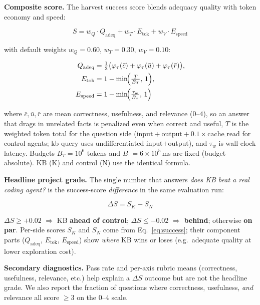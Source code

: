 \medskip
\noindent\textbf{Composite score.}  The harvest success score blends adequacy
quality with token economy and speed:

\begin{equation}
S = w_Q \cdot Q_{\text{adeq}} + w_T \cdot E_{\text{tok}} + w_V \cdot E_{\text{speed}}
\label{eq:success}
\end{equation}

\noindent with default weights $w_Q = 0.60$, $w_T = 0.30$, $w_V = 0.10$:

\begin{align}
Q_{\text{adeq}} &= \tfrac{1}{3}\bigl(\varphi_\tau(\bar{c}) + \varphi_\tau(\bar{u}) + \varphi_\tau(\bar{r})\bigr), \notag \\
E_{\text{tok}} &= 1 - \min\!\Bigl(\tfrac{T}{B_T},\,1\Bigr), \notag \\
E_{\text{speed}} &= 1 - \min\!\Bigl(\tfrac{\tau_w}{B_\tau},\,1\Bigr)
\label{eq:success-components}
\end{align}

\noindent where $\bar{c}, \bar{u}, \bar{r}$ are mean correctness, usefulness, and relevance ($0$--$4$),
so an answer that drags in unrelated facts is penalized even when correct and useful,
$T$ is the weighted token total for the question side
($\text{input} + \text{output} + 0.1 \times \text{cache\_read}$ for control agents;
kb query uses undifferentiated input$+$output), and $\tau_w$ is
wall-clock latency.  Budgets $B_T = 10^6$ tokens and $B_\tau = 6\times 10^5$\,ms
are fixed (budget-absolute).  KB (K) and control (N) use the identical formula.

\medskip
\noindent\textbf{Headline project grade.}  The single number that answers
\emph{does KB beat a real coding agent?} is the success-score \emph{difference}
in the same evaluation run:

\begin{equation}
\Delta S = S_K - S_N
\label{eq:delta-s}
\end{equation}

\noindent $\Delta S \geq +0.02$ $\Rightarrow$ KB \textbf{ahead of control};
$\Delta S \leq -0.02$ $\Rightarrow$ \textbf{behind}; otherwise \textbf{on par}.
Per-side scores $S_K$ and $S_N$ come from Eq.~\ref{eq:success}; their component
parts ($Q_{\text{adeq}}$, $E_{\text{tok}}$, $E_{\text{speed}}$) show \emph{where} KB wins or
loses (e.g.\ adequate quality at lower exploration cost).

\medskip
\noindent\textbf{Secondary diagnostics.}  Pass rate and per-axis rubric means
(correctness, usefulness, relevance, etc.) help explain a $\Delta S$ outcome but are
not the headline grade.  We also report the fraction of questions where
correctness, usefulness, \emph{and} relevance all score $\geq 3$ on the 0--4 scale.

